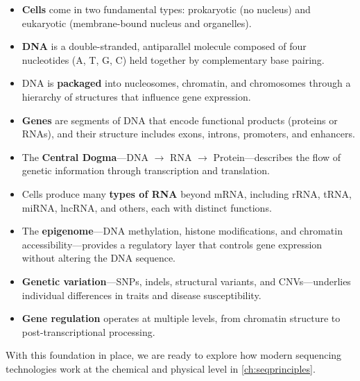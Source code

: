 \begin{itemize}[itemsep=2pt]
  \item \textbf{Cells} come in two fundamental types: prokaryotic (no nucleus) and eukaryotic (membrane-bound nucleus and organelles).
  \item \textbf{DNA} is a double-stranded, antiparallel molecule composed of four nucleotides (A, T, G, C) held together by complementary base pairing.
  \item DNA is \textbf{packaged} into nucleosomes, chromatin, and chromosomes through a hierarchy of structures that influence gene expression.
  \item \textbf{Genes} are segments of DNA that encode functional products (proteins or RNAs), and their structure includes exons, introns, promoters, and enhancers.
  \item The \textbf{Central Dogma}---DNA $\rightarrow$ RNA $\rightarrow$ Protein---describes the flow of genetic information through transcription and translation.
  \item Cells produce many \textbf{types of RNA} beyond mRNA, including rRNA, tRNA, miRNA, lncRNA, and others, each with distinct functions.
  \item The \textbf{epigenome}---DNA methylation, histone modifications, and chromatin accessibility---provides a regulatory layer that controls gene expression without altering the DNA sequence.
  \item \textbf{Genetic variation}---SNPs, indels, structural variants, and CNVs---underlies individual differences in traits and disease susceptibility.
  \item \textbf{Gene regulation} operates at multiple levels, from chromatin structure to post-transcriptional processing.
\end{itemize}

With this foundation in place, we are ready to explore how modern sequencing technologies work at the chemical and physical level in \cref{ch:seqprinciples}.
